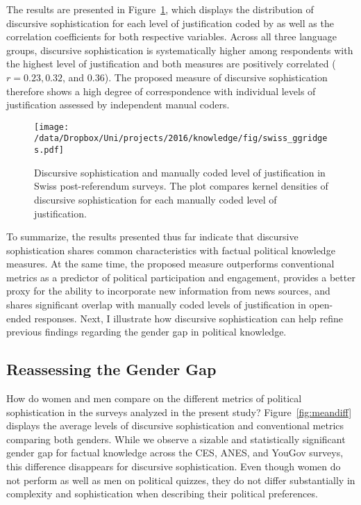 The results are presented in Figure~\ref{fig:swiss_ggridges}, which displays the distribution of discursive sophistication for each level of justification coded by \citet{colombo2016justifications} as well as the correlation coefficients for both respective variables. Across all three language groups, discursive sophistication is systematically higher among respondents with the highest level of justification and both measures are positively correlated ($r=0.23, 0.32$, and $0.36$). The proposed measure of discursive sophistication therefore shows a high degree of correspondence with individual levels of justification assessed by independent manual coders.

\begin{figure}[h]\centering
\texttt{[image: /data/Dropbox/Uni/projects/2016/knowledge/fig/swiss\_ggridges.pdf]}
\caption[Discursive sophistication and manually coded level of justification in Swiss post-referendum surveys]{Discursive sophistication and manually coded level of justification \citep{colombo2016justifications} in Swiss post-referendum surveys. The plot compares kernel densities of discursive sophistication for each manually coded level of justification.}\label{fig:swiss_ggridges}
\end{figure}

To summarize, the results presented thus far indicate that discursive sophistication shares common characteristics with factual political knowledge measures. At the same time, the proposed measure outperforms conventional metrics as a predictor of political participation and engagement, provides a better proxy for the ability to incorporate new information from news sources, and shares significant overlap with manually coded levels of justification in open-ended responses. Next, I illustrate how discursive sophistication can help refine previous findings regarding the gender gap in political knowledge.

\subsection*{Reassessing the Gender Gap}
How do women and men compare on the different metrics of political sophistication in the surveys analyzed in the present study? Figure~\ref{fig:meandiff} displays the average levels of discursive sophistication and conventional metrics comparing both genders. While we observe a sizable and statistically significant gender gap for factual knowledge across the CES, ANES, and YouGov surveys, this difference disappears for discursive sophistication. Even though women do not perform as well as men on political quizzes, they do not differ substantially in complexity and sophistication when describing their political preferences.

